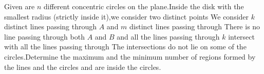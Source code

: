 Given are $n$ different concentric circles on the plane.Inside the disk with the smallest radius (strictly inside it),we consider two distinct points We consider $k$ distinct lines passing through $A$ and $m$ distinct lines passing through There is no line passing through both $A$ and $B$ and all the lines passing through $k$ intersect with all the lines passing through The intersections do not lie on some of the circles.Determine the maximum and the minimum number of regions formed by the lines and the circles and are inside the circles.